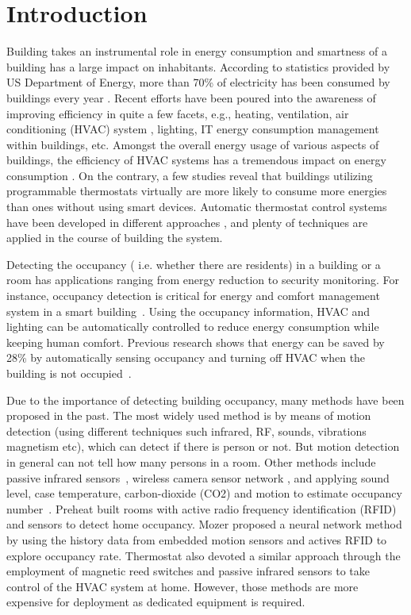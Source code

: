 \section{Introduction}
Building takes an instrumental role in energy consumption and smartness of a
building has a large impact on inhabitants. According to statistics provided by
US Department of Energy, more than 70\% of electricity has been consumed by
buildings every year \cite{doe_annual}. Recent efforts have been poured into the awareness of
improving efficiency in quite a few facets, e.g., heating, ventilation, air
conditioning (HVAC) system \cite{erickson2009energy}\cite{gao2009selfprog},
lighting\cite{delaney2009eval}, IT energy consumption management within
buildings\cite{agarwal2009augnet}\cite{agarwal2010sleep}, etc. Amongst the
overall energy usage of various aspects of buildings, the efficiency of HVAC
systems has a tremendous impact on energy consumption \cite{hobby2012analysis}.
On the contrary, a few studies \cite{bias1999elec} reveal that buildings
utilizing programmable thermostats virtually are more likely to consume more
energies than ones without using smart devices. Automatic thermostat control
systems have been developed in different approaches
\cite{thomas2012intelligent}\cite{lu2012eval}, and plenty of techniques are
applied in the course of building the system.

Detecting the occupancy ( i.e. whether there are residents) in a
building or a room has applications ranging from energy reduction
to security monitoring. For instance, occupancy detection is critical for energy and comfort
management system in a smart building~\cite{Nguyen2013Energy}.  Using
the occupancy information, HVAC and lighting can be automatically
controlled to reduce energy consumption while keeping human comfort.
Previous research shows that energy can be saved by 28\% by
automatically sensing occupancy and turning off HVAC when the building
is not occupied~\cite{Lu:SenSys10}.

Due to the importance of detecting building occupancy, many methods
have been proposed in the past. The most widely used method is by
means of motion detection (using different techniques such infrared,
RF, sounds, vibrations magnetism etc), which can detect if there is
person or not. But motion detection in general can not tell how many
persons in a room.  Other methods include passive infrared
sensors~\cite{Dodier2006Building}, wireless camera sensor network
\cite{erickson2009energy}, and applying sound level, case temperature,
carbon-dioxide (CO2) and motion to estimate occupancy
number~\cite{Ekwevugbe2013Real}.  Preheat \cite{scott2011ctrl} built rooms with
active radio frequency identification (RFID) and sensors to detect
home occupancy. Mozer \cite{mozer1997neurothermostat} proposed a neural network method by
using the history data from embedded motion sensors and actives RFID
to explore occupancy rate. Thermostat \cite{lu2010smartthermostat} also devoted a
similar approach through the employment of magnetic reed switches and
passive infrared sensors to take control of the HVAC system at
home. However, those methods are more expensive for deployment as
dedicated equipment is required.

